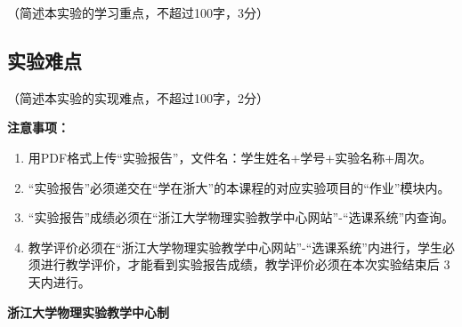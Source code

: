 \documentclass[10pt,a4paper]{ctexart}
\newcommand{\myspace}[1]{\par\vspace{#1\baselineskip}} %
\newcommand{\sihao}{\fontsize{14pt}{18pt}\selectfont}
\newcommand{\xiaosi}{\fontsize{12pt}{16pt}\selectfont}
\begin{document}
    \xiaosi（简述本实验的学习重点，不超过100字，3分）
    

    \myspace{2}
    
    \subsection{实验难点}
    
    \xiaosi（简述本实验的实现难点，不超过100字，2分）


\myspace{2}


\newpage

\sihao\textbf{注意事项：}
\xiaosi
\begin{enumerate}
    \item 用PDF格式上传“实验报告”，文件名：学生姓名+学号+实验名称+周次。
    \item  “实验报告”必须递交在“学在浙大”的本课程的对应实验项目的“作业”模块内。
    \item  “实验报告”成绩必须在“浙江大学物理实验教学中心网站”-“选课系统”内查询。
    \item 教学评价必须在“浙江大学物理实验教学中心网站”-“选课系统”内进行，学生必须进行教学评价，才能看到实验报告成绩，教学评价必须在本次实验结束后 3 天内进行。
\end{enumerate}

\vspace{1cm}
\xiaosi\centering \textbf{浙江大学物理实验教学中心制}
\end{document}
